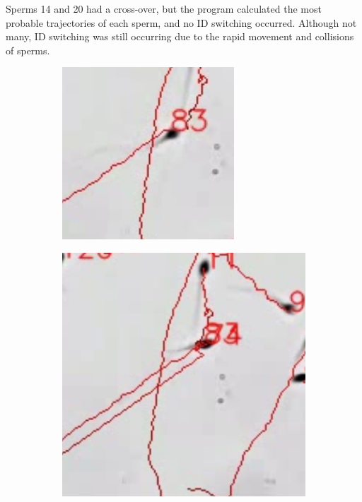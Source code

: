 Sperms 14 and 20 had a cross-over, but the program calculated the most probable trajectories of each sperm, and no ID switching occurred.
\newpage
Although not many, ID switching was still occurring due to the rapid movement and collisions of sperms. 

\begin{figure}[ht]
     \centering
     \begin{subfigure}[b]{0.3\textwidth}
         \centering
         \includegraphics[width=\textwidth]{Images/sam3333.png}
     \end{subfigure}
     \hfill
     \begin{subfigure}[b]{0.3\textwidth}
         \centering
         \includegraphics[width=\textwidth]{Images/sam33333.png}

\end{subfigure}
\end{figure}
